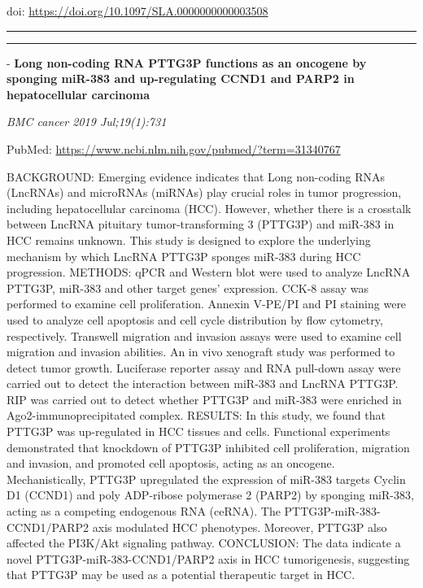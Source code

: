 \documentclass[]{article}
\begin{document}
doi: \url{https://doi.org/10.1097/SLA.0000000000003508}

{}

{}

\begin{center}\rule{0.5\linewidth}{\linethickness}\end{center}

\begin{center}\rule{0.5\linewidth}{\linethickness}\end{center}

 - \textbf{Long non-coding RNA PTTG3P functions as an oncogene by
sponging miR-383 and up-regulating CCND1 and PARP2 in hepatocellular
carcinoma}

\emph{BMC cancer 2019 Jul;19(1):731}

PubMed: \url{https://www.ncbi.nlm.nih.gov/pubmed/?term=31340767}

BACKGROUND: Emerging evidence indicates that Long non-coding RNAs
(LncRNAs) and microRNAs (miRNAs) play crucial roles in tumor
progression, including hepatocellular carcinoma (HCC). However, whether
there is a crosstalk between LncRNA pituitary tumor-transforming 3
(PTTG3P) and miR-383 in HCC remains unknown. This study is designed to
explore the underlying mechanism by which LncRNA PTTG3P sponges miR-383
during HCC progression. METHODS: qPCR and Western blot were used to
analyze LncRNA PTTG3P, miR-383 and other target genes' expression. CCK-8
assay was performed to examine cell proliferation. Annexin V-PE/PI and
PI staining were used to analyze cell apoptosis and cell cycle
distribution by flow cytometry, respectively. Transwell migration and
invasion assays were used to examine cell migration and invasion
abilities. An in vivo xenograft study was performed to detect tumor
growth. Luciferase reporter assay and RNA pull-down assay were carried
out to detect the interaction between miR-383 and LncRNA PTTG3P. RIP was
carried out to detect whether PTTG3P and miR-383 were enriched in
Ago2-immunoprecipitated complex. RESULTS: In this study, we found that
PTTG3P was up-regulated in HCC tissues and cells. Functional experiments
demonstrated that knockdown of PTTG3P inhibited cell proliferation,
migration and invasion, and promoted cell apoptosis, acting as an
oncogene. Mechanistically, PTTG3P upregulated the expression of miR-383
targets Cyclin D1 (CCND1) and poly ADP-ribose polymerase 2 (PARP2) by
sponging miR-383, acting as a competing endogenous RNA (ceRNA). The
PTTG3P-miR-383-CCND1/PARP2 axis modulated HCC phenotypes. Moreover,
PTTG3P also affected the PI3K/Akt signaling pathway. CONCLUSION: The
data indicate a novel PTTG3P-miR-383-CCND1/PARP2 axis in HCC
tumorigenesis, suggesting that PTTG3P may be used as a potential
therapeutic target in HCC.
\end{document}
